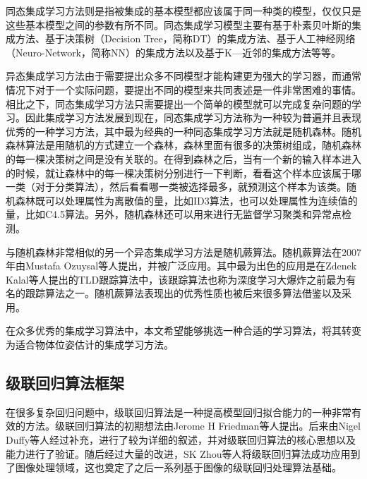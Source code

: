 同态集成学习方法则是指被集成的基本模型都应该属于同一种类的模型，仅仅只是这些基本模型之间的参数有所不同。同态集成学习模型主要有基于朴素贝叶斯的集成方法、基于决策树（Decision Tree，简称DT）的集成方法\cite{kearns1996boosting}、基于人工神经网络（Neuro-Network，简称NN）的集成方法\cite{zhou2002ensembling}\cite{zhou2002selectively}\cite{hansen1990neural}以及基于K—近邻的集成方法\cite{shen2007euk}等等。

异态集成学习方法由于需要提出众多不同模型才能构建更为强大的学习器，而通常情况下对于一个实际问题，要提出不同的模型来共同表述是一件非常困难的事情。相比之下，同态集成学习方法只需要提出一个简单的模型就可以完成复杂问题的学习。因此集成学习方法发展到现在，同态集成学习方法称为一种较为普遍并且表现优秀的一种学习方法，其中最为经典的一种同态集成学习方法就是随机森林\cite{breiman2001random}。随机森林算法是用随机的方式建立一个森林，森林里面有很多的决策树组成，随机森林的每一棵决策树之间是没有关联的。在得到森林之后，当有一个新的输入样本进入的时候，就让森林中的每一棵决策树分别进行一下判断，看看这个样本应该属于哪一类（对于分类算法），然后看看哪一类被选择最多，就预测这个样本为该类。随机森林既可以处理属性为离散值的量，比如ID3算法，也可以处理属性为连续值的量，比如C4.5算法。另外，随机森林还可以用来进行无监督学习聚类和异常点检测。

与随机森林非常相似的另一个异态集成学习方法是随机蕨算法\cite{ozuysal2007fast}。随机蕨算法在2007年由Mustafa Ozuysal等人提出，并被广泛应用。其中最为出色的应用是在Zdenek Kalal等人提出的TLD跟踪算法中\cite{kalal2012tracking}，该跟踪算法也称为深度学习大爆炸之前最为有名的跟踪算法之一。随机蕨算法表现出的优秀性质也被后来很多算法借鉴以及采用\cite{dollar2010cascaded}。

在众多优秀的集成学习算法中，本文希望能够挑选一种合适的学习算法，将其转变为适合物体位姿估计的集成学习方法。

\subsection{级联回归算法框架} %

在很多复杂回归问题中，级联回归算法是一种提高模型回归拟合能力的一种非常有效的方法。级联回归算法的初期想法由Jerome H Friedman等人提出\cite{friedman2001greedy}。后来由Nigel Duffy等人经过补充，进行了较为详细的叙述，并对级联回归算法的核心思想以及能力进行了验证\cite{duffy2002boosting}。随后经过大量的改进，SK Zhou等人将级联回归算法成功应用到了图像处理领域\cite{zhou2005image}，这也奠定了之后一系列基于图像的级联回归处理算法基础。

